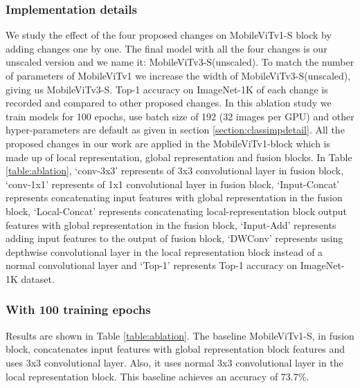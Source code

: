 \documentclass{article} \usepackage{iclr2022_conference,times}
\begin{document}
\subsubsection{Implementation details}
We study the effect of the four proposed changes on MobileViTv1-S block by adding changes one by one.
The final model with all the four changes is our unscaled version and we name it: MobileViTv3-S(unscaled). 
To match the number of parameters of MobileViTv1 we increase the width of MobileViTv3-S(unscaled), giving us MobileViTv3-S.
Top-1 accuracy on ImageNet-1K of each change is recorded and compared to other proposed changes. 
In this ablation study we train models for 100 epochs, use batch size of 192 (32 images per GPU) and other hyper-parameters are default as given in section \ref{section:classimpdetail}. All the proposed changes in our work are applied in the MobileViTv1-block which is made up of local representation, global representation and fusion blocks. 
In Table \ref{table:ablation}, `conv-3x3' represents of 3x3 convolutional layer in fusion block, `conv-1x1' represents of 1x1 convolutional layer in fusion block, `Input-Concat' represents concatenating input features with global representation in the fusion block, `Local-Concat' represents concatenating local-representation block output features with global representation in the fusion block, `Input-Add' represents adding input features to the output of fusion block, `DWConv' represents using depthwise convolutional layer in the local representation block instead of a normal convolutional layer and `Top-1' represents Top-1 accuracy on ImageNet-1K dataset.

\subsubsection{With 100 training epochs}
Results are shown in Table \ref{table:ablation}. 
The baseline MobileViTv1-S, in fusion block, concatenates input features with global representation block features and uses 3x3 convolutional layer. 
Also, it uses normal 3x3 convolutional layer in the local representation block. 
This baseline achieves an accuracy of 73.7\%. 
\end{document}
